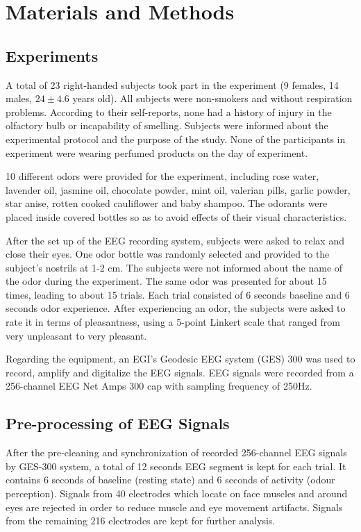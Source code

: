 \section{Materials and Methods}

\subsection{Experiments}
A total of 23 right-handed subjects took part in the experiment (9 females, 14 males, $24 \pm 4.6$ years old). All subjects were non-smokers and without respiration problems. According to their self-reports, none had a history of injury in the olfactory bulb or incapability of smelling. Subjects were informed about the experimental protocol and the purpose of the study. None of the participants in experiment were wearing perfumed products on the day of experiment. 

10 different odors were provided for the experiment, including rose water, lavender oil, jasmine oil, chocolate powder, mint oil, valerian pills, garlic powder, star anise, rotten cooked cauliflower and baby shampoo. The odorants were placed inside covered bottles so as to avoid effects of their visual characteristics.

After the set up of the EEG recording system, subjects were asked to relax and close their eyes. One odor bottle was randomly selected and provided to the subject's nostrils at 1-2 cm. The subjects were not informed about the name of the odor during the experiment. The same odor was presented for about 15 times, leading to about 15 trials. Each trial consisted of 6 seconds baseline and 6 seconds odor experience. After experiencing an odor, the subjects were asked to rate it in terms of pleasantness, using a 5-point Linkert scale that ranged from very unpleasant to very pleasant. 

Regarding the equipment, an EGI's Geodesic EEG system (GES) 300 was used to record, amplify and digitalize the EEG signals. EEG signals were recorded from a 256-channel EEG Net Amps 300 cap with sampling frequency of 250Hz.  

\subsection{Pre-processing of EEG Signals}
After the pre-cleaning and synchronization of recorded 256-channel EEG signals by GES-300 system, a total of 12 seconds EEG segment is kept for each trial. It contains 6 seconds of baseline (resting state) and 6 seconds of activity (odour perception). Signals from 40 electrodes which locate on face muscles and around eyes are rejected in order to reduce muscle and eye movement artifacts. Signals from the remaining 216 electrodes are kept for further analysis. 

